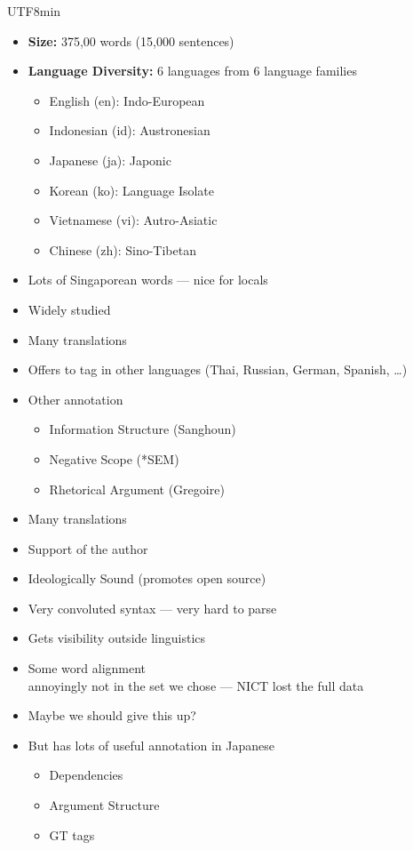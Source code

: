 \documentclass[25pt,landscape,headrule,footrule,dvips]{foils}
\newcommand{\emp}[1]{\textcolor{red}{#1}}
\newcommand{\myslide}[1]{\foilhead[-25mm]{\raisebox{12mm}[0mm]{\emp{#1}}}}
\begin{document}
\begin{CJK}{UTF8}{min}
\myslide{Tourism Corpus}
\begin{itemize}\addtolength{\itemsep}{-0.8ex}
\item \textbf{Size:} 375,00 words (15,000 sentences)
\item \textbf{Language Diversity:} 6 languages from 6 language families
  \begin{itemize}
  \item English (en): Indo-European
  \item Indonesian (id): Austronesian
  \item Japanese (ja): Japonic
  \item Korean (ko): Language Isolate
  \item Vietnamese (vi): Autro-Asiatic 
  \item Chinese (zh): Sino-Tibetan
  \end{itemize}
\item Lots of Singaporean words --- nice for locals
\end{itemize}

\myslide{Stories}
\begin{itemize}
\item Widely studied
\item Many translations
\item Offers to tag in other languages (Thai, Russian, German, Spanish, \ldots)
\item Other annotation
  \begin{itemize}
  \item Information Structure (Sanghoun)
  \item Negative Scope (*SEM)
  \item Rhetorical Argument (Gregoire)
  \end{itemize}
\end{itemize}

\myslide{Essay}
\begin{itemize}
\item Many translations
\item Support of the author
\item Ideologically Sound (promotes open source)
\item Very convoluted syntax --- very hard to parse
\item Gets visibility outside linguistics
\end{itemize}

\myslide{News}
\begin{itemize}
\item Some word alignment
  \\ annoyingly not in the set we chose --- NICT lost the full data
\item Maybe we should give this up?
\item But has lots of useful annotation in Japanese
  \begin{itemize}
  \item Dependencies
  \item Argument Structure
  \item GT tags
  \end{itemize}
\end{itemize}


\end{CJK}
\end{document}
